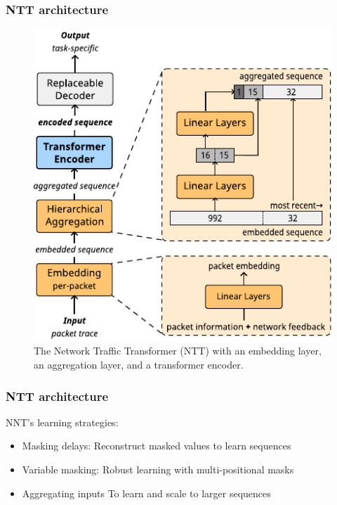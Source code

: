 \documentclass{beamer}
\begin{document}
\begin{frame}
\frametitle{NTT architecture}

\begin{figure}[!hbt]
  \begin{center}
    \includegraphics[scale=0.8]{figures/architecture_ntt.pdf}
    \caption{The Network Traffic Transformer (NTT) with
        an embedding layer, %
        an aggregation layer, and
        a transformer encoder.}
    \label{fig:ntt}
  \end{center}
\end{figure}
\end{frame}

\begin{frame}
\frametitle{NTT architecture}

NNT's learning strategies: 
\pause 
\begin{itemize}
    \item<1-> \alert{Masking delays:} Reconstruct masked values to learn sequences 
    \item<1-> \alert{Variable masking:} Robust learning with multi-positional masks
    \item<1-> \alert{Aggregating inputs} To learn and scale to larger sequences
\end{itemize}
\end{frame}
\end{document}
